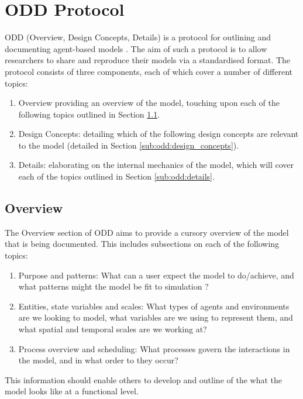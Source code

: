 \section{ODD Protocol}
\label{sec:odd}

ODD (Overview, Design Concepts, Details) is a protocol for outlining and
documenting agent-based models
\cite{grimm2006standard,grimm2010odd,grimm2020odd}.
The aim of such a protocol is to allow researchers to share and reproduce their
models via a standardised format.
The protocol consists of three components, each of which cover a number of
different topics:
\begin{enumerate}
    \item Overview providing an overview of the model, touching upon each of the
        following topics outlined in Section \ref{sub:odd:overview}.
    \item Design Concepts: detailing which of the following design concepts are
        relevant to the model (detailed in Section
        \ref{sub:odd:design_concepts}).
    \item Details: elaborating on the internal mechanics of the model, which
        will cover each of the topics outlined in Section \ref{sub:odd:details}.
\end{enumerate}

\subsection{Overview}
\label{sub:odd:overview}

The Overview section of ODD aims to provide a cursory overview of the model that
is being documented.
This includes subsections on each of the following topics:
\begin{enumerate}
    \item Purpose and patterns: What can a user  expect the model to do/achieve,
        and what patterns might the model be fit to simulation
        \cite{grimm2012pattern}?
    \item Entities, state variables and scales: What types of agents and
        environments are we looking to model, what variables are we using to
        represent them, and what spatial and temporal scales are we working at?
    \item Process overview and scheduling: What processes govern the
        interactions in the model, and in what order to they occur?
\end{enumerate}
This information should enable others to develop and outline of the what the
model looks like at a functional level.

